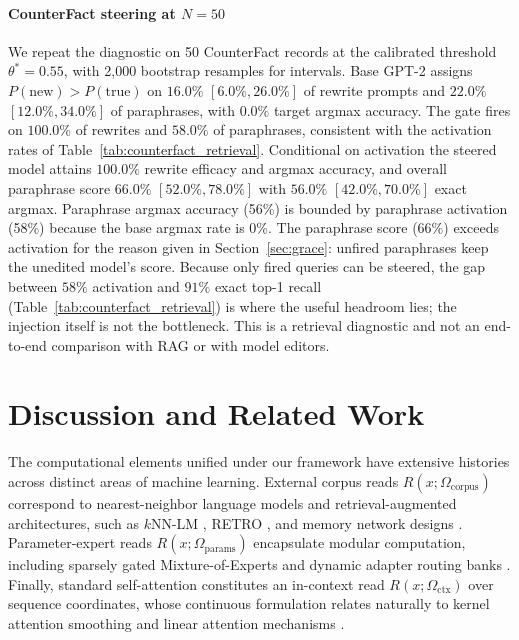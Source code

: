 \documentclass[preprint,12pt]{elsarticle}
\newcommand{\Om}{\Omega}
\newif\ifmarkchanges
\newcommand{\revii}[1]{\ifmarkchanges{\color{blue}#1}\else#1\fi}
\begin{document}
\paragraph{CounterFact steering at $N=50$}
We repeat the diagnostic on 50 CounterFact records at the calibrated threshold $\theta^* = 0.55$, with 2,000 bootstrap resamples for intervals. Base GPT-2 assigns $P(\mathrm{new}) > P(\mathrm{true})$ on $16.0\%$ $[6.0\%, 26.0\%]$ of rewrite prompts and $22.0\%$ $[12.0\%, 34.0\%]$ of paraphrases, with $0.0\%$ target argmax accuracy. The gate fires on $100.0\%$ of rewrites and $58.0\%$ of paraphrases, consistent with the activation rates of Table~\ref{tab:counterfact_retrieval}. Conditional on activation the steered model attains $100.0\%$ rewrite efficacy and argmax accuracy, and overall paraphrase score $66.0\%$ $[52.0\%, 78.0\%]$ with $56.0\%$ $[42.0\%, 70.0\%]$ exact argmax. \revii{Paraphrase argmax accuracy (56\%) is bounded by paraphrase activation (58\%) because the base argmax rate is 0\%. The paraphrase score (66\%) exceeds activation for the reason given in Section~\ref{sec:grace}: unfired paraphrases keep the unedited model's score. Because only fired queries can be steered,} the gap between $58\%$ activation and $91\%$ exact top-1 recall (Table~\ref{tab:counterfact_retrieval}) is where the useful headroom lies; the injection itself is not the bottleneck. This is a retrieval diagnostic and not an end-to-end comparison with RAG or with model editors.

\section{Discussion and Related Work}
\label{sec:discussion}

The computational elements unified under our framework have extensive histories across distinct areas of machine learning. External corpus reads $R(x; \Om_{\mathrm{corpus}})$ correspond to nearest-neighbor language models and retrieval-augmented architectures, such as $k$NN-LM \cite{khandelwal2020generalization, he2021efficient}, RETRO \cite{borgeaud2022improving}, and memory network designs \cite{sukhbaatar2015end, lample2019large}. Parameter-expert reads $R(x; \Om_{\mathrm{params}})$ encapsulate modular computation, including sparsely gated Mixture-of-Experts \cite{shazeer2017outrageously, fedus2022switch, jiang2024mixtral} and dynamic adapter routing banks \cite{hu2021lora}. Finally, standard self-attention \cite{vaswani2017attention} constitutes an in-context read $R(x; \Om_{\mathrm{ctx}})$ over sequence coordinates, whose continuous formulation relates naturally to kernel attention smoothing and linear attention mechanisms \cite{tsai2019transformer, katharopoulos2020transformers}.
\end{document}
